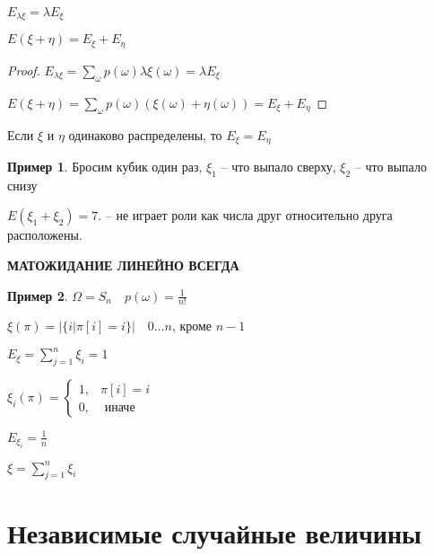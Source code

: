 \documentclass{book}
\theoremstyle{definition}
\newtheorem*{example}{Пример}
\begin{document}
\begin{theorem}
    $E_{\lambda\xi} = \lambda E_{\xi}$

    $E\left( \xi + \eta \right)  = E_{\xi} + E_{\eta}$
\end{theorem}
\begin{proof}
    $E_{\lambda\xi} = \sum_{\omega}p\left( \omega \right) \lambda\xi\left( \omega \right)  = \lambda E_{\xi}$

    $E\left( \xi + \eta \right)  = \sum_{\omega  }p\left( \omega \right) \left( \xi\left( \omega \right)  + \eta\left( \omega \right)  \right) = E_{\xi} + E_{\eta}$
\end{proof}

\begin{statement}
    Если $\xi$ и  $\eta$ одинаково распределены, то  $E_{\xi} = E_{\eta}$
\end{statement}

\begin{example}
    Бросим кубик один раз, $\xi_1$ -- что выпало сверху, $\xi_2$ -- что выпало снизу

    $E\left( \xi_1 + \xi_2 \right)  = 7$. -- не играет роли как числа друг относительно друга расположены.
\end{example}

\begin{center}
    {\Huge \textbf{ \color{red} МАТОЖИДАНИЕ ЛИНЕЙНО ВСЕГДА}}
    
\end{center}

\begin{example}
    $\Omega = S_n\quad p(\omega) = \frac{1}{n!}$ 

    $\xi\left( \pi  \right)  = \left| \{i | \pi [i] = i\} \right| \quad 0\ldots n$, кроме $n-1$

    $E_{\xi} = \sum_{j=1}^{n} \xi_i = 1$

    $\xi_i\left( \pi  \right)  = \begin{cases}
        1, & \pi [i] = i\\
        0, & \text{ иначе}
    \end{cases}$ 

    $E_{\xi_i} = \frac{1}{n}$ 

    $\xi = \sum_{j=1}^{n} \xi_i$

\end{example}
\section{Независимые случайные величины}
\end{document}
